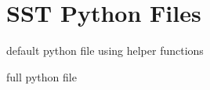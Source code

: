 
\section{SST Python Files}

\label{sec:pythonFiles}

\begin{ViFile}
default python file 
using helper functions
\end{ViFile}

\begin{ViFile}
full python file
\end{ViFile}


